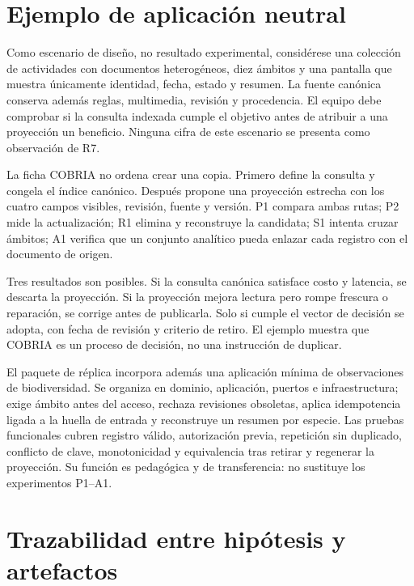 \documentclass[12pt]{article}
\begin{document}
\section{Ejemplo de aplicación neutral}

Como escenario de diseño, no resultado experimental, considérese una colección de
actividades con documentos heterogéneos, diez ámbitos y una
pantalla que muestra únicamente identidad, fecha, estado y resumen. La fuente canónica
conserva además reglas, multimedia, revisión y procedencia. El equipo debe comprobar
si la consulta indexada cumple el objetivo antes de atribuir a una proyección un
beneficio. Ninguna cifra de este escenario se presenta como observación de R7.

La ficha COBRIA no ordena crear una copia. Primero define la consulta y congela el índice
canónico. Después propone una proyección estrecha con los cuatro campos visibles,
revisión, fuente y versión. P1 compara ambas rutas; P2 mide la actualización; R1 elimina
y reconstruye la candidata; S1 intenta cruzar ámbitos; A1 verifica que un conjunto
analítico pueda enlazar cada registro con el documento de origen.

Tres resultados son posibles. Si la consulta canónica satisface costo y latencia, se
descarta la proyección. Si la proyección mejora lectura pero rompe frescura o reparación,
se corrige antes de publicarla. Solo si cumple el vector de decisión se adopta, con fecha
de revisión y criterio de retiro. El ejemplo muestra que COBRIA es un proceso de
decisión, no una instrucción de duplicar.

El paquete de réplica incorpora además una aplicación mínima de observaciones de
biodiversidad. Se organiza en dominio, aplicación, puertos e infraestructura; exige
ámbito antes del acceso, rechaza revisiones obsoletas, aplica idempotencia ligada a la
huella de entrada y reconstruye un resumen por especie. Las pruebas funcionales cubren
registro válido, autorización previa, repetición sin duplicado, conflicto de clave,
monotonicidad y equivalencia tras retirar y regenerar la proyección. Su función es
pedagógica y de transferencia: no sustituye los experimentos P1--A1.

\section{Trazabilidad entre hipótesis y artefactos}
\end{document}
